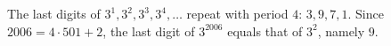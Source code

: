 The last digits of $3^1,3^2,3^3,3^4,\dots$ repeat with period $4$: $3,9,7,1$. Since $2006=4\cdot501+2$, the last digit of $3^{2006}$ equals that of $3^2$, namely $\boxed{9}$.

